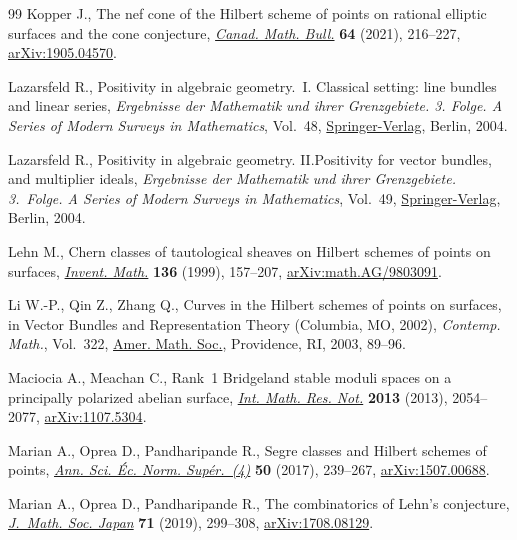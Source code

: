 \documentclass[10pt,a4paper]{amsart}
\numberwithin{equation}{section}
\begin{document}
\begin{thebibliography}{99}
Kopper J., The nef cone of the {H}ilbert scheme of points on rational elliptic
 surfaces and the cone conjecture, \href{https://doi.org/10.4153/S0008439520000387}{\textit{Canad. Math. Bull.}} \textbf{64}
 (2021), 216--227, \href{https://arxiv.org/abs/1905.04570}{arXiv:1905.04570}.

Lazarsfeld R., Positivity in algebraic geometry.~{I}. Classical setting: line
 bundles and linear series, \textit{Ergebnisse der Mathematik und ihrer
 Grenzgebiete. 3. Folge. A Series of Modern Surveys in Mathematics}, Vol.~48,
 \href{https://doi.org/10.1007/978-3-642-18808-4}{Springer-Verlag}, Berlin, 2004.

Lazarsfeld R., Positivity in algebraic geometry. {II}.Positivity for vector
 bundles, and multiplier ideals, \textit{Ergebnisse der Mathematik und ihrer
 Grenzgebiete. 3.~Folge. A Series of Modern Surveys in Mathematics}, Vol.~49,
 \href{https://doi.org/10.1007/978-3-642-18810-7}{Springer-Verlag}, Berlin, 2004.

Lehn M., Chern classes of tautological sheaves on {H}ilbert schemes of points
 on surfaces, \href{https://doi.org/10.1007/s002220050307}{\textit{Invent. Math.}} \textbf{136} (1999), 157--207,
 \href{https://arxiv.org/abs/math.AG/9803091}{arXiv:math.AG/9803091}.

Li W.-P., Qin Z., Zhang Q., Curves in the {H}ilbert schemes of points on
 surfaces, in Vector Bundles and Representation Theory ({C}olumbia, {MO},
 2002), \textit{Contemp. Math.}, Vol.~322, \href{https://doi.org/10.1090/conm/322/05681}{Amer. Math. Soc.}, Providence, RI,
 2003, 89--96.

Maciocia A., Meachan C., Rank~1 {B}ridgeland stable moduli spaces on a
 principally polarized abelian surface, \href{https://doi.org/10.1093/imrn/rns107}{\textit{Int. Math. Res. Not.}}
 \textbf{2013} (2013), 2054--2077, \href{https://arxiv.org/abs/1107.5304}{arXiv:1107.5304}.

Marian A., Oprea D., Pandharipande R., Segre classes and {H}ilbert schemes of
 points, \href{https://doi.org/10.24033/asens.2320}{\textit{Ann. Sci. \'Ec. Norm. Sup\'er.~(4)}} \textbf{50} (2017),
 239--267, \href{https://arxiv.org/abs/1507.00688}{arXiv:1507.00688}.

Marian A., Oprea D., Pandharipande R., The combinatorics of {L}ehn's
 conjecture, \href{https://doi.org/10.2969/jmsj/78747874}{\textit{J.~Math. Soc. Japan}} \textbf{71} (2019), 299--308,
 \href{https://arxiv.org/abs/1708.08129}{arXiv:1708.08129}.


\end{thebibliography}
\end{document}
